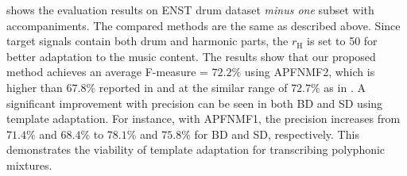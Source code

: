 \documentclass{article}
\begin{document}
 shows the evaluation results on ENST drum dataset \textit{minus one} subset with accompaniments. The compared methods are the same as described above. Since target signals contain both drum and harmonic parts, the $r_\mathrm{H}$ is set to 50 for better adaptation to the music content. The results show that our proposed method achieves an average F-measure = $72.2\%$ using APFNMF2, which is higher than $67.8\%$ reported in \cite{gillet_transcription_2008} and at the similar range of $72.7\%$ as in \cite{Paulus2009a}. A significant improvement with precision can be seen in both BD and SD using template adaptation. For instance, with APFNMF1, the precision increases from $71.4\%$ and $68.4\%$ to $78.1\%$ and $75.8\%$ for BD and SD, respectively. This demonstrates the viability of template adaptation for transcribing polyphonic mixtures. 
\end{document}
